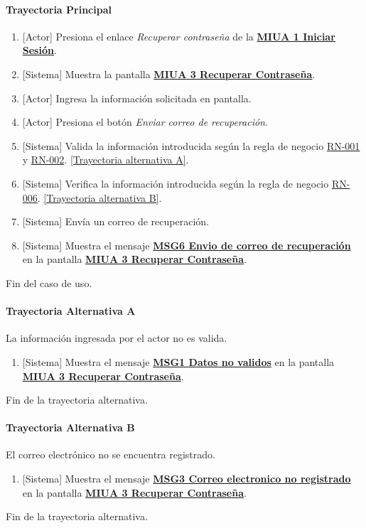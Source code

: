 \paragraph{Trayectoria Principal}
	\begin{enumerate}
	    \item {[Actor]} Presiona el enlace \textit{Recuperar contraseña} de la \hyperref[fig:MIUA-1]{\bf MIUA 1 Iniciar Sesión}.
	    \item {[Sistema]} Muestra la pantalla \hyperref[fig:MIUA-3]{\bf MIUA 3 Recuperar Contraseña}.
	    \item {[Actor]} Ingresa la información solicitada en pantalla.
	    \item {[Actor]} Presiona el botón \textit{Enviar correo de recuperación}.
	    \item {[Sistema]} Valida la información introducida según la regla de negocio \hyperref[RN001]{RN-001} y \hyperref[RN002]{RN-002}. \hyperref[A-USR-CU3:TA]{[Trayectoria alternativa A]}.
	    \item {[Sistema]} Verifica la información introducida según la regla de negocio \hyperref[RN006]{RN-006}. \hyperref[A-USR-CU3:TB]{[Trayectoria alternativa B]}.
	    \item {[Sistema]} Envía un correo de recuperación.
	    \item {[Sistema]} Muestra el mensaje \hyperref[MSG6]{\bf MSG6 Envio de correo de recuperación} en la pantalla \hyperref[fig:MIUA-3]{\bf MIUA 3 Recuperar Contraseña}.
	\end{enumerate}
	Fin del caso de uso.

\paragraph{Trayectoria Alternativa A} \label{A-USR-CU3:TA}
	La información ingresada por el actor no es valida.
	\begin{enumerate}[label=A\arabic*.]
		\item {[Sistema]} Muestra el mensaje \hyperref[MSG1]{\bf MSG1 Datos no validos} en la pantalla \hyperref[fig:MIUA-3]{\bf MIUA 3 Recuperar Contraseña}.
	\end{enumerate}
	Fin de la trayectoria alternativa.

\paragraph{Trayectoria Alternativa B} \label{A-USR-CU3:TB}
	El correo electrónico no se encuentra registrado.
	\begin{enumerate}[label=A\arabic*.]
		\item {[Sistema]} Muestra el mensaje \hyperref[MSG3]{\bf MSG3 Correo electronico no registrado} en la pantalla \hyperref[fig:MIUA-3]{\bf MIUA 3 Recuperar Contraseña}.
	\end{enumerate}
	Fin de la trayectoria alternativa.